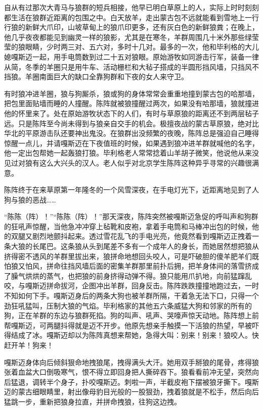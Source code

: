 \par 自从有过那次大青马与狼群的短兵相接，他早已明白草原上的人，实际上时时刻刻都生活在狼群近距离的包围之中。白天放羊，走出蒙古包不远就能看到雪地上一行行狼的新鲜大爪印，山坡草甸上的狼爪印更多，还有灰白色的新鲜狼粪；在晚上，他几乎夜夜都能见到幽灵一样的狼影，尤其是在寒冬，羊群周围几十米外那些绿莹莹的狼眼睛，少时两三对、五六对，多时十几对。最多的一次，他和毕利格的大儿媳嘎斯迈一起，用手电筒数到过二十五对狼眼。原始游牧如同游击行军，装备一律从简，冬季的羊圈只是用牛车、活动栅栏和大毡子搭成的半圆形挡风墙，只挡风不挡狼。羊圈南面巨大的缺口全靠狗群和下夜的女人来守卫。
\par 有时狼冲进羊圈，狼与狗厮杀，狼或狗的身体常常会重重地撞到蒙古包的哈那墙，把包里面贴墙而睡的人撞醒。陈阵就被狼撞醒过两次，如果没有哈那墙，狼就撞进他的怀里来了。处在原始游牧状态下的人们，有时与草原狼的距离还不到两层毡子远。只是陈阵至今尚未得到与狼亲自交手的机会。极擅夜战的蒙古草原狼，绝对比华北的平原游击队还要神出鬼没。在狼群出没频繁的夜晚，陈阵总是强迫自己睡得惊醒一点儿，并请嘎斯迈在下夜值班的时候，如果遇到狼冲进羊群就喊他的名字，他一定出包帮她一起轰狼打狼。毕利格老人常常捻着山羊胡子微笑，他说他从来没见过对狼有这么大兴头的汉人。老人似乎对北京学生陈阵这种异乎寻常的兴趣很满意。
\par 陈阵终于在来草原第一年隆冬的一个风雪深夜，在手电灯光下，近距离地见到了人狗与狼的恶战……
\par “陈陈（阵）！”“陈陈（阵）！”那天深夜，陈阵突然被嘎斯迈急促的呼叫声和狗群的狂吼声惊醒，当他急冲冲穿上毡靴和皮袍，拿着手电筒和马棒冲出包的时候，他的双腿又剧烈地颤抖起来。透过雪花乱飞的手电光亮，他竟然看到嘎斯迈正拽着一条大狼的长尾巴。这条狼从头到尾差不多有一个成年人的身长，而她居然想把狼从挤得密不透风的羊群里拔出来，狼拼命地想回头咬人，可是吓破胆的傻羊肥羊们既怕狼又怕风，拼命往挡风墙后面的密集羊群那里前扑后拥，把羊身体间的落雪挤成了臊气烘烘的蒸气，也把狼的前身挤得动弹不得。狼只能用爪扒地，向前猛蹿乱咬，与嘎斯迈拼命拔河，企图冲出羊群，回身反击。陈阵跌跌撞撞地跑过去，一时不知如何下手。嘎斯迈身后的两条大狗也被羊群所隔，干着急无法下口，只得一个劲狂吼猛叫，压制大狼的气焰。毕利格家的其他五六条威猛大狗和邻家的所有的狗，正在羊群的东边与狼群死掐。狗的叫声、吼声、哭嚎声惊天动地。陈阵想上前帮嘎斯迈，可两腿抖得就是迈不开步。他原先想亲手触摸一下活狼的热望，早被吓得结成了冰。嘎斯迈却以为陈阵真想来帮她，急得大叫：别来！别来！狼咬人。快赶开羊！狗来！
\par 嘎斯迈身体向后倾斜狠命地拽狼尾，拽得满头大汗。她用双手掰狼的尾骨，疼得狼张着血盆大口倒吸寒气，恨不得立即回身把人撕碎吞下。狼看看前冲无望，突然向后猛退，调转半个身子，扑咬嘎斯迈。刺啦一声，半截皮袍下摆被狼牙撕下。嘎斯迈的蒙古细眼睛里，射出像母豹目光般的一股狠劲，拽着狼就是不松手，然后向后猛跳一步，重新把狼身拉直，并拼命拽狼，往狗这边拽。
